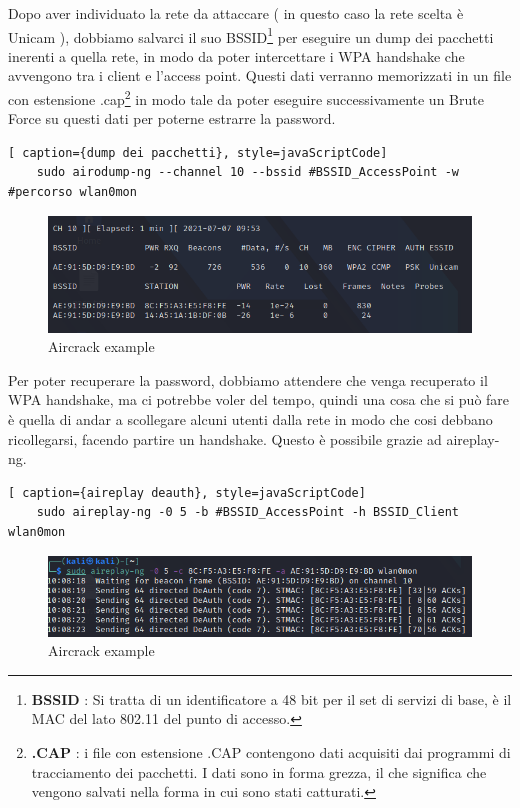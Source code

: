 \newpage

Dopo aver individuato la rete da attaccare ( in questo caso la rete scelta è Unicam ), dobbiamo salvarci il suo BSSID\footnote[1]{\textbf{BSSID} : Si tratta di un identificatore a 48 bit per il set di servizi di base, è il MAC del lato 802.11 del punto di accesso.} per eseguire un dump dei pacchetti inerenti a quella rete, in modo da poter intercettare i WPA handshake che avvengono tra i client e l'access point. Questi dati verranno memorizzati in un file con estensione .cap\footnote[1]{\textbf{.CAP} : i file con estensione .CAP contengono dati acquisiti dai programmi di tracciamento dei pacchetti. I dati sono in forma grezza, il che significa che vengono salvati nella forma in cui sono stati catturati.} in modo tale da poter eseguire successivamente un Brute Force su questi dati per poterne estrarre la password.

\begin{lstlisting}[ caption={dump dei pacchetti}, style=javaScriptCode]
	sudo airodump-ng --channel 10 --bssid #BSSID_AccessPoint -w #percorso wlan0mon
\end{lstlisting}

\begin{figure}[ht]
    \centering
    \includegraphics[width=\linewidth]{Immagini/6/aircrack_4.png}
    \caption{Aircrack example}
    \label{fig:Aircrack example}
\end{figure}

Per poter recuperare la password, dobbiamo attendere che venga recuperato il WPA handshake, ma ci potrebbe voler del tempo, quindi una cosa che si può fare è quella di andar a scollegare alcuni utenti dalla rete in modo che cosi debbano ricollegarsi, facendo partire un handshake. Questo è possibile grazie ad aireplay-ng.

\begin{lstlisting}[ caption={aireplay deauth}, style=javaScriptCode]
	sudo aireplay-ng -0 5 -b #BSSID_AccessPoint -h BSSID_Client wlan0mon
\end{lstlisting}

\begin{figure}[ht]
    \centering
    \includegraphics[width=\linewidth]{Immagini/6/aircrack_7.png}
    \caption{Aircrack example}
    \label{fig:Aircrack example}
\end{figure}

